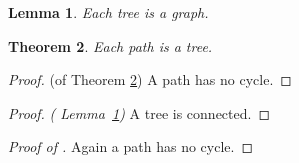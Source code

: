 \documentclass{amsart}
\newtheorem{theorem}{Theorem}
\newtheorem{lemma}[theorem]{Lemma}
\begin{document}
\begin{lemma}\label{a} Each tree is a graph. \end{lemma}
\begin{theorem}\label{b} Each path is a tree. \end{theorem}
\begin{proof} (of Theorem \ref{b}) A path has no cycle. \end{proof}
\begin{proof} \textit{( Lemma~\ref{a})} A tree is connected. \end{proof}
\begin{proof}[Proof of ] Again a path has no cycle. \end{proof}
\end{document}
